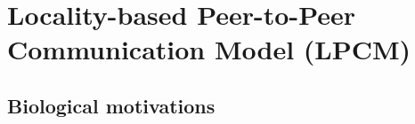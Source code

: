 \chapter{Locality-based Peer-to-Peer Communication Model (LPCM)}
\label{local-comm}

\section{Biological motivations}



